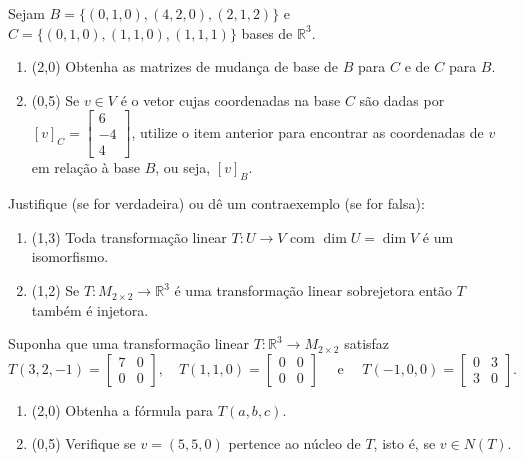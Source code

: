 \documentclass[12pt,a4paper]{article}
\newcommand{\fixme}{{\color{red}(...)}}
\newcommand*\R{\mathbb{R}}
\begin{document}
\begin{ExerciseList}
\Exercise[title={2,5}] Sejam
$B = \{ (0,1,0), (4,2,0), (2,1,2) \}$ e
$C = \{ (0,1,0), (1,1,0), (1,1,1) \}$ bases de $\R^3$.
\begin{enumerate}
\item (2,0) Obtenha as matrizes de mudança de base de $B$ para $C$ e de $C$ para $B$.
\item (0,5) Se $v \in V$ é o vetor cujas coordenadas na base $C$ são dadas por $[v]_C =
\begin{bmatrix}
6 \\
-4 \\
4
\end{bmatrix}$, utilize o item anterior para encontrar as coordenadas de $v$ em relação à base $B$, ou seja, $[v]_B$.
\end{enumerate}
\Answer \fixme


\Exercise[title={2,5}] Justifique (se for verdadeira) ou dê um contraexemplo (se for falsa):
\begin{enumerate}
\item (1,3) Toda transformação linear $T: U \to V$ com $\dim{U} = \dim{V}$ é um isomorfismo.
\item (1,2) Se $T: M_{2 \times 2} \to \R^3$ é uma transformação linear sobrejetora então $T$ também é injetora.
\end{enumerate}
\Answer \fixme

\Answer \fixme

\Exercise[title={2,5}] Suponha que uma transformação linear $T: \R^3 \to M_{2\times 2}$ satisfaz
\[
T(3,2,-1) = \begin{bmatrix}
7 & 0\\
0 & 0
\end{bmatrix}, \quad
T(1,1,0) = \begin{bmatrix}
0 & 0\\
0 & 0
\end{bmatrix} \quad\text{ e } \quad
T(-1,0,0) = \begin{bmatrix}
0 & 3\\
3 & 0
\end{bmatrix}.
\]
\begin{enumerate}
\item (2,0) Obtenha a fórmula para $T(a,b,c)$.
\item (0,5) Verifique se $v = (5,5,0)$ pertence ao núcleo de $T$, isto é, se $v \in N(T)$.
\end{enumerate}


\end{ExerciseList}
\end{document}
